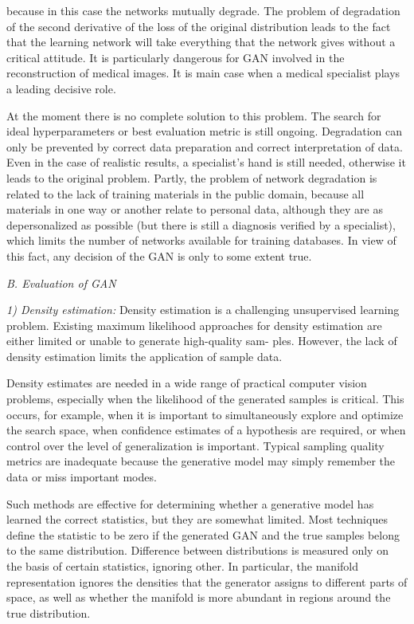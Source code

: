 \documentclass[10pt, a4paper]{article}
\begin{document}
\begin{multicols}{2}
\noindent
\fontsize{10}{14}\selectfont
    because in this case the networks mutually degrade. The problem of degradation of the second derivative of the loss of the original distribution leads to the fact that the learning network will take everything that the network gives without a critical attitude. It is particularly dangerous for GAN involved in the reconstruction of medical images. It is main case when a medical specialist plays a leading decisive role. \par
At the moment there is no complete solution to this problem. The search for ideal hyperparameters or best evaluation metric is still ongoing. Degradation can only be prevented by correct data preparation and correct interpretation of data. Even in the case of realistic results, a specialist’s hand is still needed, otherwise it leads to the original problem. Partly, the problem of network degradation is related to the lack of training materials in the public domain, because all materials in one way or another relate to personal data, although they are as depersonalized as possible (but there is still a diagnosis verified by a specialist), which limits the number of networks available for training databases. In view of this fact, any decision of the GAN is only to some extent true. \par
\vspace{0.5cm}
\noindent
\textit{B. Evaluation of GAN} 
\vspace{0.2cm}
\par
\textit{1) Density estimation:} Density estimation is a challenging unsupervised learning problem. Existing maximum likelihood approaches for density estimation are either limited or unable to generate high-quality sam- ples. However, the lack of density estimation limits the application of sample data. \par
Density estimates are needed in a wide range of practical computer vision problems, especially when the likelihood of the generated samples is critical. This occurs, for example, when it is important to simultaneously explore and optimize the search space, when confidence estimates of a hypothesis are required, or when control over the level of generalization is important. Typical sampling quality metrics are inadequate because the generative model may simply remember the data or miss important modes.

Such methods are effective for determining whether a generative model has learned the correct statistics, but they are somewhat limited. Most techniques define the statistic to be zero if the generated GAN and the true samples belong to the same distribution. Difference between distributions is measured only on the basis of certain statistics, ignoring other. In particular, the manifold representation ignores the densities that the generator assigns to different parts of space, as well as whether the manifold is more abundant in regions around the true distribution.


\end{multicols}
\end{document}
